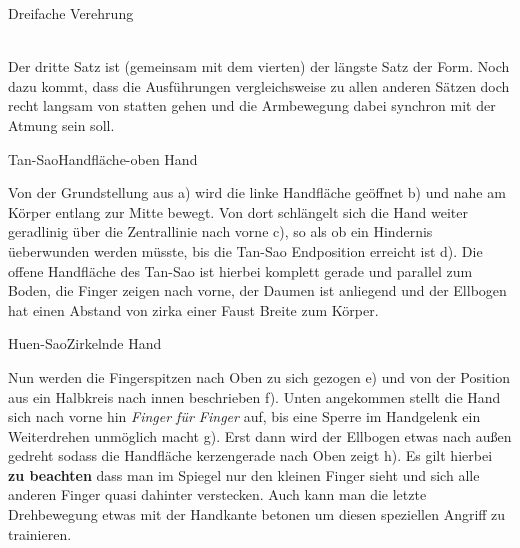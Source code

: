 
\begin{WTSatz}{Dreifache Verehrung}%
	
	\vspace{4px} %
	\\ 
	Der dritte Satz ist (gemeinsam mit dem vierten) der l\"angste Satz der Form. Noch dazu kommt, dass die Ausf\"uhrungen vergleichsweise zu allen anderen S\"atzen doch recht langsam von statten gehen und die Armbewegung dabei synchron mit der Atmung sein soll.
	

	\begin{WTSatzTeil}{Tan-Sao}{Handfl\"ache-oben Hand}
		
		Von der Grundstellung aus a) wird die linke Handfl\"ache ge\"offnet b) und nahe am K\"orper entlang zur Mitte bewegt. Von dort schl\"angelt sich die Hand weiter geradlinig \"uber die Zentrallinie nach vorne c), so als ob ein Hindernis \"ueberwunden werden m\"usste, bis die Tan-Sao Endposition erreicht ist d). Die offene Handfl\"ache des Tan-Sao ist hierbei komplett gerade und parallel zum Boden, die Finger zeigen nach vorne, der Daumen ist anliegend und der Ellbogen hat einen Abstand von zirka einer Faust Breite zum K\"orper. %
		
	\end{WTSatzTeil}
	\begin{WTSatzTeil}{Huen-Sao}{Zirkelnde Hand}
		
		Nun werden die Fingerspitzen nach Oben zu sich gezogen e) und von der Position aus ein Halbkreis nach innen beschrieben f). Unten angekommen stellt die Hand sich nach vorne hin \textit{Finger f\"ur Finger} auf, bis eine Sperre im Handgelenk ein Weiterdrehen unm\"oglich macht g). Erst dann wird der Ellbogen etwas nach au{\ss}en gedreht sodass die Handfl\"ache kerzengerade nach Oben zeigt h). Es gilt hierbei \textbf{zu beachten} dass man im Spiegel nur den kleinen Finger sieht und sich alle anderen Finger quasi dahinter verstecken. Auch kann man die letzte Drehbewegung etwas mit der Handkante betonen um diesen speziellen Angriff zu trainieren.
		

\end{WTSatzTeil}
\end{WTSatz}
